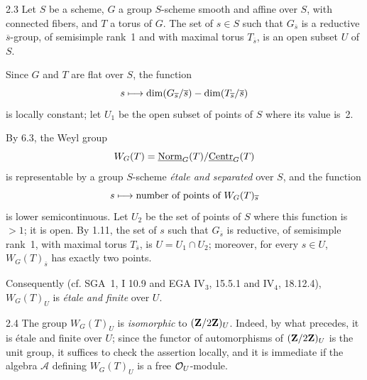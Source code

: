 \begin{lemma}{2.3}\label{XIX.2.3}
Let $S$ be a scheme, $G$ a group $S$-scheme smooth and affine over $S$, with connected fibers, and $T$ a torus of $G$. The set of $s\in S$ such that $G_{\overline{s}}$ is a reductive $\overline{s}$-group, of semisimple rank~1 and with maximal torus $T_{\overline{s}}$, is an open subset $U$ of $S$.
\end{lemma}
Since $G$ and $T$ are flat over $S$, the function
\[
s\longmapsto\dim(G_{\overline{s}}/\overline{s})-\dim(T_{\overline{s}}/\overline{s})
\]
is locally constant; let $U_1$ be the open subset of points of $S$ where its value is~2.

{\renewcommand{\thefootnote}{(17)}}%
By 6.3, the Weyl group
\[
W_G(T)=\underline{\mathrm{Norm}}_G(T)/\underline{\mathrm{Centr}}_G(T)
\]
is representable by a group $S$-scheme \emph{\'etale and separated} over $S$, and the function
\[
s\longmapsto\text{number of points of }W_G(T)_{\overline{s}}
\]
is lower semicontinuous. Let $U_2$ be the set of points of $S$ where this function is $>1$; it is open. By 1.11, the set of $s$ such that $G_{\overline{s}}$ is reductive, of semisimple rank~1, with maximal torus $T_{\overline{s}}$, is $U=U_1\cap U_2$; moreover, for every $s\in U$, $W_G(T)_{\overline{s}}$ has exactly two points.

Consequently (cf. SGA~1, I 10.9 and EGA IV$_3$, 15.5.1 and IV$_4$, 18.12.4), $W_G(T)_U$ is \emph{\'etale and finite} over $U$.

\begin{remark}{2.4}\label{XIX.2.4}
The group $W_G(T)_U$ is \emph{isomorphic} to $(\mathbf{Z}/2\mathbf{Z})_U$. Indeed, by what precedes, it is \'etale and finite over $U$; since the functor of automorphisms of $(\mathbf{Z}/2\mathbf{Z})_U$ is the unit group, it suffices to check the assertion locally, and it is immediate if the algebra $\mathcal A$ defining $W_G(T)_U$ is a free $\mathcal{O}_U$-module.{\renewcommand{\thefootnote}{(18)}}
\end{remark}

